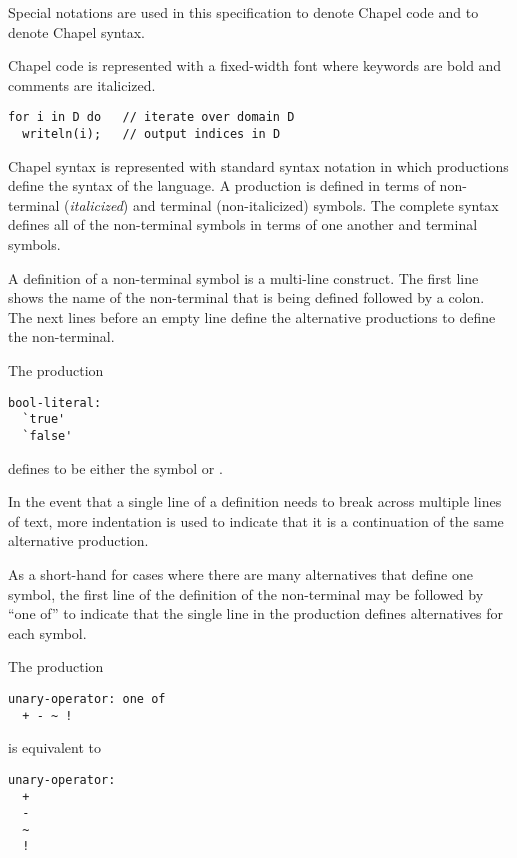 \label{Notation}

Special notations are used in this specification to denote Chapel code
and to denote Chapel syntax.

Chapel code is represented with a fixed-width font where keywords are
bold and comments are italicized.
\begin{example}
\begin{chapel}
\begin{verbatim}
for i in D do   // iterate over domain D
  writeln(i);   // output indices in D
\end{verbatim}
\end{chapel}
\end{example}

Chapel syntax is represented with standard syntax notation in which
productions define the syntax of the language.  A production is
defined in terms of non-terminal ({\it italicized}) and terminal
(non-italicized) symbols.  The complete syntax defines all of the
non-terminal symbols in terms of one another and terminal symbols.

A definition of a non-terminal symbol is a multi-line construct.  The
first line shows the name of the non-terminal that is being defined
followed by a colon.  The next lines before an empty line define the
alternative productions to define the non-terminal.
\begin{example}
The production
\begin{syntaxdonotcollect}
\begin{verbatim}
bool-literal:
  `true'
  `false'
\end{verbatim}
\end{syntaxdonotcollect}
defines  to be either the symbol  or
.
\end{example}
In the event that a single line of a definition needs to break across
multiple lines of text, more indentation is used to indicate that it
is a continuation of the same alternative production.

As a short-hand for cases where there are many alternatives that
define one symbol, the first line of the definition of the
non-terminal may be followed by ``one of'' to indicate that the single
line in the production defines alternatives for each symbol.
\begin{example}
The production
\begin{syntaxdonotcollect}
\begin{verbatim}
unary-operator: one of
  + - ~ !
\end{verbatim}
\end{syntaxdonotcollect}
is equivalent to
\begin{syntaxdonotcollect}
\begin{verbatim}
unary-operator:
  +
  -
  ~
  !
\end{verbatim}
\end{syntaxdonotcollect}
\end{example}

